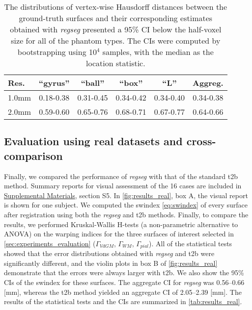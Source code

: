 \documentclass[3p,authoryear,fleqn]{elsarticle}
\providecommand{\regseg}{\emph{regseg}}
\providecommand{\suppl}[1]{\href{http://figshare.com/s/459c26b4ee8211e493b306ec4bbcf141}{Supplemental Materials}, #1}
\begin{document}
\begin{table}
    \centering
    \footnotesize
    \tabcolsep=0.1cm
    \begin{tabular}{lccccc}
    Res.   & ``gyrus'' & ``ball''  & ``box''   & ``L''     & Aggreg.    \\\hline
    1.0mm  & 0.18-0.38 & 0.31-0.45 & 0.34-0.42 & 0.34-0.40 & 0.34-0.38  \\
    2.0mm  & 0.59-0.60 & 0.65-0.76 & 0.68-0.71 & 0.67-0.77 & 0.64-0.66  \\
    \hline
    \end{tabular}
    \caption{The distributions of vertex-wise Hausdorff distances between the ground-truth surfaces and their
    corresponding estimates obtained with \regseg{} presented a 95\% CI below the half-voxel size for all of 
    the phantom types.
    The CIs were computed by bootstrapping using 10$^4$ samples, with the median as the location statistic.}\label{tab:ci_phantom}
\end{table}

\subsection{Evaluation using real datasets and cross-comparison}\label{sec:results_hcp}
Finally, we compared the performance of \regseg{} with that of the standard \gls*{t2b}
  method.
Summary reports for visual assessment of the 16 cases are included in \suppl{section S5}.
In \autoref{fig:results_real}, box A, the visual report is shown for one subject.
We computed the \gls*{swindex} \eqref{eq:swindex} of every surface after registration
  using both the \regseg{} and \gls*{t2b} methods.
Finally, to compare the results, we performed Kruskal-Wallis H-tests
  (a non-parametric alternative to ANOVA) on the warping indices for the three surfaces of 
  interest selected in \autoref{sec:experiments_evaluation}
  ($\Gamma_{VdGM}$, $\Gamma_{WM}$, $\Gamma_{pial}$).
All of the statistical tests showed that the error distributions obtained with \regseg{} and
  \gls*{t2b} were significantly different, and the violin plots in box B of
  \autoref{fig:results_real} demonstrate that the errors were always larger with \gls*{t2b}.
We also show the 95\% CIs of the \gls*{swindex} for these surfaces.
The aggregate CI for \regseg{} was 0.56--0.66 [mm], whereas the \gls*{t2b} method
  yielded an aggregate CI of 2.05--2.39 [mm].
The results of the statistical tests and the CIs are summarized in \autoref{tab:results_real}.
\end{document}
